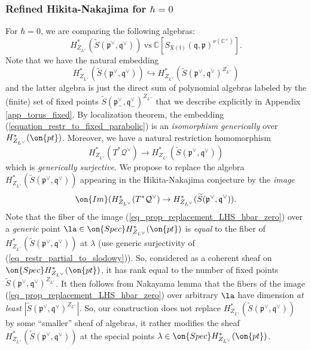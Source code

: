 \documentclass[12pt]{amsart}
\begin{document}
\subsubsection{Refined Hikita-Nakajima for $\hbar=0$}    For $\hbar=0$, we are comparing the following algebras:
    \begin{equation*}
    H^*_{Z_{L^\vee}}(\widetilde{S}(\mathfrak{p}^\vee,\mathfrak{q}^\vee))~\text{vs}~\mathbb{C}[S_{\mathfrak{X}(\mathfrak{l})}(\mathfrak{q},\mathfrak{p})^{\nu(\mathbb{C}^\times)}].
    \end{equation*}
    Note that we have the natural embedding \begin{equation}\label{equation_restr_to_fixed_parabolic}
    H^*_{Z_{L^\vee}}(\widetilde{S}(\mathfrak{p}^\vee,\mathfrak{q}^\vee)) \hookrightarrow H^*_{Z_{L^\vee}}(\widetilde{S}(\mathfrak{p}^\vee,\mathfrak{q}^\vee)^{Z_{L^\vee}})
    \end{equation}
    and the latter algebra is just the direct sum of polynomial algebras labeled by the (finite) set of fixed points $\widetilde{S}(\mathfrak{p}^\vee_-,\mathfrak{q}^\vee_-)^{Z_{L^\vee}}$ that we describe explicitly in Appendix \ref{app_torus_fixed}. By localization theorem, the embedding (\ref{equation_restr_to_fixed_parabolic}) is an {\emph{isomorphism generically}} over $H^*_{Z_{L^\vee}}(\on{pt})$. Moreover, we have a natural restriction homomorphism 
    \begin{equation}\label{eq_restr_partial_to_slodowy}
    H^*_{Z_{L^\vee}}(T^*\mathcal{Q}^\vee) \rightarrow  H^*_{Z_{L^\vee}}(\widetilde{S}(\mathfrak{p}^\vee,\mathfrak{q}^\vee))
    \end{equation}
    which is  {\emph{generically surjective}}. We propose to replace the algebra $H^*_{Z_{L^\vee}}(\widetilde{S}(\mathfrak{p}^\vee,\mathfrak{q}^\vee))$ appearing in the Hikita-Nakajima conjecture by the {\emph{image}} 
    \begin{equation}\label{eq_prop_replacement_LHS_hbar_zero}
    \on{Im}(H^*_{Z_{L^\vee}}(T^*\mathcal{Q}^\vee) 
    \rightarrow H^*_{Z_{L^\vee}}(\widetilde{S}(\mathfrak{p}^\vee,\mathfrak{q}^\vee)).
    \end{equation}
    Note that the fiber of the image (\ref{eq_prop_replacement_LHS_hbar_zero}) over a {\emph{generic}} point $\la \in \on{Spec}H^*_{Z_{L^\vee}}(\on{pt})$ is {\emph{equal}} to the fiber of $H^*_{Z_{L^\vee}}(\widetilde{S}(\mathfrak{p}^\vee,\mathfrak{q}^\vee))$ at $\lambda$ (use generic surjectivity of (\ref{eq_restr_partial_to_slodowy})). So, considered as a coherent sheaf on $\on{Spec}H^*_{Z_{L^\vee}}(\on{pt})$, it has rank equal to the number of fixed points $\widetilde{S}(\mathfrak{p}^\vee,\mathfrak{q}^\vee)^{Z_{L^\vee}}$. It then follows from Nakayama lemma that the fibers of the image (\ref{eq_prop_replacement_LHS_hbar_zero}) over arbitrary $\la$ have dimension {\emph{at least}} $|\widetilde{S}(\mathfrak{p}^\vee,\mathfrak{q}^\vee)^{Z_{L^\vee}}|$. So, our construction does not replace $H^*_{Z_{L^\vee}}(\widetilde{S}(\mathfrak{p}^\vee,\mathfrak{q}^\vee))$ by some  ``smaller'' sheaf of algebras, it rather modifies the sheaf $H^*_{Z_{L^\vee}}(\widetilde{S}(\mathfrak{p}^\vee,\mathfrak{q}^\vee))$ at the special points $\lambda \in \on{Spec}H^*_{Z_{L^\vee}}(\on{pt})$.
\end{document}
